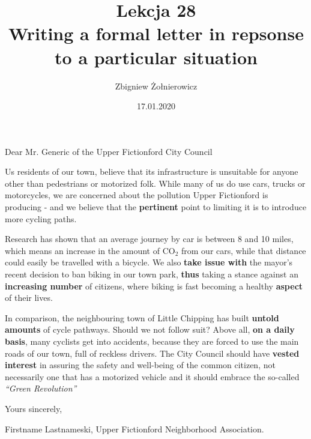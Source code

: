 \documentclass[a4paper]{article}
\begin{document}
\title{{\huge Lekcja 28} \\
{\large Writing a formal letter in repsonse to a particular situation}}
\author{Zbigniew Żołnierowicz}
\date{17.01.2020}
\maketitle
Dear Mr. Generic of the Upper Fictionford City Council

Us residents of our town, believe that its infrastructure is unsuitable for anyone other than pedestrians or motorized folk.
While many of us do use cars, trucks or motorcycles, we are concerned about the pollution Upper Fictionford is producing - and we believe that the \textbf{pertinent} point to limiting it is to introduce more cycling paths.

Research has shown that an average journey by car is between 8 and 10 miles, which means an increase in the amount of CO$_2$ from our cars, while that distance could easily be travelled with a bicycle.
We also \textbf{take issue with} the mayor's recent decision to ban biking in our town park, \textbf{thus} taking a stance against an \textbf{increasing number} of citizens, where biking is fast becoming a healthy \textbf{aspect} of their lives.

In comparison, the neighbouring town of Little Chipping has built \textbf{untold amounts} of cycle pathways.
Should we not follow suit? Above all, \textbf{on a daily basis}, many cyclists get into accidents, because they are forced to use the main roads of our town, full of reckless drivers.
The City Council should have \textbf{vested interest} in assuring the safety and well-being of the common citizen, not necessarily one that has a motorized vehicle and it should embrace the so-called \emph{``Green Revolution''}

Yours sincerely,

Firstname Lastnameski,
Upper Fictionford Neighborhood Association.
\end{document}
